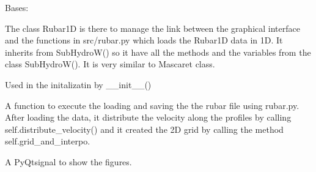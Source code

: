 \documentclass[letterpaper,10pt,english]{sphinxmanual}
\begin{document}
\begin{fulllineitems}
\label{\detokenize{index:src_GUI.hydro_GUI_2.Rubar1D}}
Bases: {\hyperref[\detokenize{index:src_GUI.hydro_GUI_2.SubHydroW}]{}}

The class Rubar1D is there to manage the link between the graphical interface and the functions in src/rubar.py
which loads the Rubar1D data in 1D. It inherits from SubHydroW() so it have all the methods and the variables
from the class SubHydroW(). It is very similar to Mascaret class.

\begin{fulllineitems}
\label{\detokenize{index:src_GUI.hydro_GUI_2.Rubar1D.init_iu}}
Used in the initalizatin by \_\_init\_\_()

\end{fulllineitems}


\begin{fulllineitems}
\label{\detokenize{index:src_GUI.hydro_GUI_2.Rubar1D.load_rubar1d}}
A function to execute the loading and saving the the rubar file using rubar.py. After loading the data,
it distribute the velocity along the profiles by calling self.distribute\_velocity() and it created the 2D grid
by calling the method self.grid\_and\_interpo.

\end{fulllineitems}


\begin{fulllineitems}
\label{\detokenize{index:src_GUI.hydro_GUI_2.Rubar1D.show_fig}}
A PyQtsignal to show the figures.

\end{fulllineitems}


\end{fulllineitems}

\end{document}
